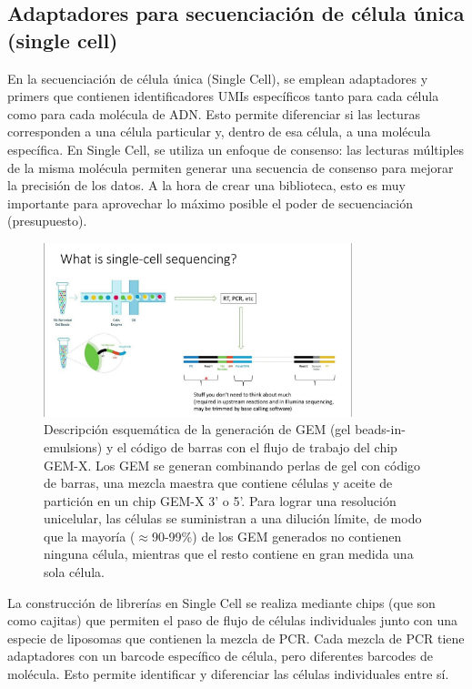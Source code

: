 \subsection{Adaptadores para secuenciación de célula única (single cell)}
En la secuenciación de célula única (Single Cell), se emplean adaptadores y primers que contienen identificadores UMIs específicos tanto para cada célula como para cada molécula de ADN. Esto permite diferenciar si las lecturas corresponden a una célula particular y, dentro de esa célula, a una molécula específica. En Single Cell, se utiliza un enfoque de consenso: las lecturas múltiples de la misma molécula permiten generar una secuencia de consenso para mejorar la precisión de los datos. A la hora de crear una biblioteca, esto es muy importante para aprovechar lo máximo posible el poder de secuenciación (presupuesto).

\begin{figure}[htbp]
\centering
\includegraphics[width = 0.8\textwidth]{figs/single-cell-seq.jpg}
\caption{Descripción esquemática de la generación de GEM (gel beads-in-emulsions) y el código de barras con el flujo de trabajo del chip GEM-X. Los GEM se generan combinando perlas de gel con código de barras, una mezcla maestra que contiene células y aceite de partición en un chip GEM-X 3' o 5'. Para lograr una resolución unicelular, las células se suministran a una dilución límite, de modo que la mayoría ($\approx$90-99\%) de los GEM generados no contienen ninguna célula, mientras que el resto contiene en gran medida una sola célula.}
\end{figure}

La construcción de librerías en Single Cell se realiza mediante chips (que son como cajitas) que permiten el paso de flujo de células individuales junto con una especie de liposomas que contienen la mezcla de PCR. Cada mezcla de PCR tiene adaptadores con un barcode específico de célula, pero diferentes barcodes de molécula. Esto permite identificar y diferenciar las células individuales entre sí.

